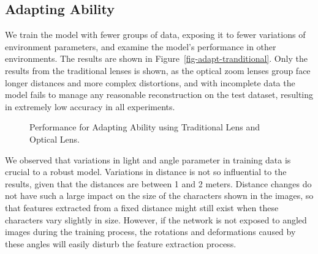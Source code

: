 \subsection{Adapting Ability}
We train the model with fewer groups of data, exposing it to fewer variations of environment parameters, and examine the model's performance in other environments. The results are shown in Figure~\ref{fig-adapt-tranditional}. Only the results from the traditional lenses is shown, as the optical zoom lenses group face longer distances and more complex distortions, and with incomplete data the model fails to manage any reasonable reconstruction on the test dataset, resulting in extremely low accuracy in all experiments.
\begin{figure}[!t]
    \centering
    \hfill
    \caption{Performance for Adapting Ability using Traditional Lens and Optical Lens.}
    \label{fig:adapting}
\end{figure}

We observed that variations in light and angle parameter in training data is crucial to a robust model. Variations in distance is not so influential to the results, given that the distances are between 1 and 2 meters. Distance changes do not have such a large impact on the size of the characters shown in the images, so that features extracted from a fixed distance might still exist when these characters vary slightly in size. However, if the network is not exposed to angled images during the training process, the rotations and deformations caused by these angles will easily disturb the feature extraction process.

